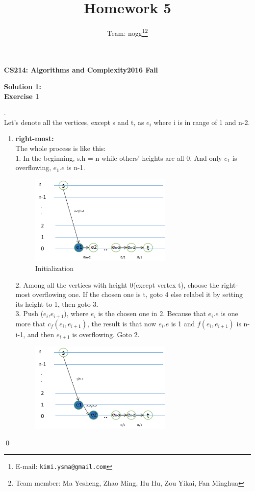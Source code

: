 \documentclass[12pt, notitlepage]{article}
\title{Homework 5}
\author{Team: nogg\footnote{E-mail: \texttt{kimi.ysma@gmail.com}}\footnote{Team member: Ma Yesheng, Zhao Ming, Hu Hu, Zou Yikai, Fan Minghua}}
\newenvironment{sol}
  {\par\vspace{3mm}\noindent{\it Solution}.}{\qed}
\begin{document}
{\bf\small CS214: Algorithms and Complexity}\hfill{\bf\small 2016 Fall}
{\let\newpage\relax\maketitle}

\textbf{Solution 1:}\\
\textbf{Exercise 1}
\begin{sol}\\
Let's denote all the vertices, except s and t, as $e_i$ where i is in range of 1 and n-2.
\begin{enumerate}
\item\textbf{right-most:}\\
The whole process is like this:\\
1. In the beginning, s.h = n while others' heights are all 0. And only $e_1$ is overflowing, $e_1.e$ is n-1.
	\begin{figure}[H]\centering
	\includegraphics[width=7cm]{1.png}
	\caption{Initialization}
	\end{figure}
2. Among all the vertices with height 0(except vertex t), choose the right-most overflowing one. If the chosen one is t, goto 4 else relabel it by setting its height to 1, then goto 3.\\
3. Push ($e_i$,$e_{i+1}$), where $e_i$ is the chosen one in 2. Because that $e_i.e$ is one more that $c_f(e_i,e_{i+1})$, the result is that now $e_i.e$ is 1 and $f(e_i,e_{i+1})$ is n-i-1, and then $e_{i+1}$ is overflowing. Goto 2.\\
	\begin{figure}[H]\centering
	\includegraphics[width=7cm]{2.png}

\end{figure}
\end{enumerate}
\end{sol}
\end{document}
